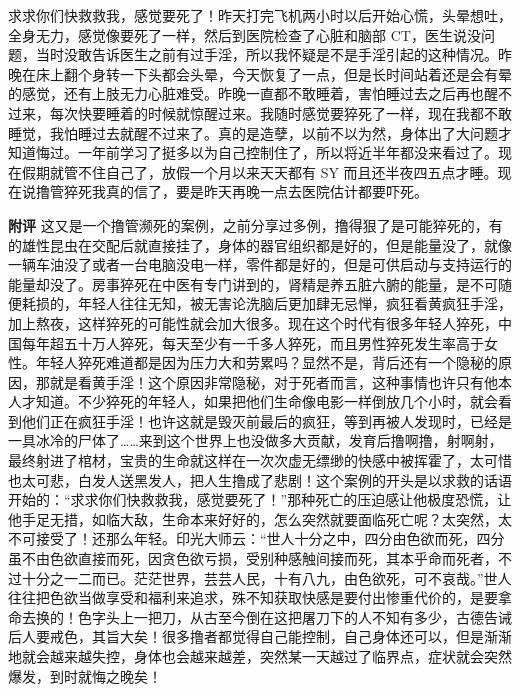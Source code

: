 \begin{case}
    求求你们快救救我，感觉要死了！昨天打完飞机两小时以后开始心慌，头晕想吐，全身无力，感觉像要死了一样，然后到医院检查了心脏和脑部 CT，医生说没问题，当时没敢告诉医生之前有过手淫，所以我怀疑是不是手淫引起的这种情况。昨晚在床上翻个身转一下头都会头晕，今天恢复了一点，但是长时间站着还是会有晕的感觉，还有上肢无力心脏难受。昨晚一直都不敢睡着，害怕睡过去之后再也醒不过来，每次快要睡着的时候就惊醒过来。我随时感觉要猝死了一样，现在我都不敢睡觉，我怕睡过去就醒不过来了。真的是造孽，以前不以为然，身体出了大问题才知道悔过。一年前学习了挺多以为自己控制住了，所以将近半年都没来看过了。现在假期就管不住自己了，放假一个月以来天天都有 SY 而且还半夜四五点才睡。现在说撸管猝死我真的信了，要是昨天再晚一点去医院估计都要吓死。

    \textbf{附评} 这又是一个撸管濒死的案例，之前分享过多例，撸得狠了是可能猝死的，有的雄性昆虫在交配后就直接挂了，身体的器官组织都是好的，但是能量没了，就像一辆车油没了或者一台电脑没电一样，零件都是好的，但是可供启动与支持运行的能量却没了。房事猝死在中医有专门讲到的，肾精是养五脏六腑的能量，是不可随便耗损的，年轻人往往无知，被无害论洗脑后更加肆无忌惮，疯狂看黄疯狂手淫，加上熬夜，这样猝死的可能性就会加大很多。现在这个时代有很多年轻人猝死，中国每年超五十万人猝死，每天至少有一千多人猝死，而且男性猝死发生率高于女性。年轻人猝死难道都是因为压力大和劳累吗？显然不是，背后还有一个隐秘的原因，那就是看黄手淫！这个原因非常隐秘，对于死者而言，这种事情也许只有他本人才知道。不少猝死的年轻人，如果把他们生命像电影一样倒放几个小时，就会看到他们正在疯狂手淫！也许这就是毁灭前最后的疯狂，等到再被人发现时，已经是一具冰冷的尸体了……来到这个世界上也没做多大贡献，发育后撸啊撸，射啊射，最终射进了棺材，宝贵的生命就这样在一次次虚无缥缈的快感中被挥霍了，太可惜也太可悲，白发人送黑发人，把人生撸成了悲剧！这个案例的开头是以求救的话语开始的：“求求你们快救救我，感觉要死了！”那种死亡的压迫感让他极度恐慌，让他手足无措，如临大敌，生命本来好好的，怎么突然就要面临死亡呢？太突然，太不可接受了！还那么年轻。印光大师云：“世人十分之中，四分由色欲而死，四分虽不由色欲直接而死，因贪色欲亏损，受别种感触间接而死，其本乎命而死者，不过十分之一二而已。茫茫世界，芸芸人民，十有八九，由色欲死，可不哀哉。”世人往往把色欲当做享受和福利来追求，殊不知获取快感是要付出惨重代价的，是要拿命去换的！色字头上一把刀，从古至今倒在这把屠刀下的人不知有多少，古德告诫后人要戒色，其旨大矣！很多撸者都觉得自己能控制，自己身体还可以，但是渐渐地就会越来越失控，身体也会越来越差，突然某一天越过了临界点，症状就会突然爆发，到时就悔之晚矣！
\end{case}

